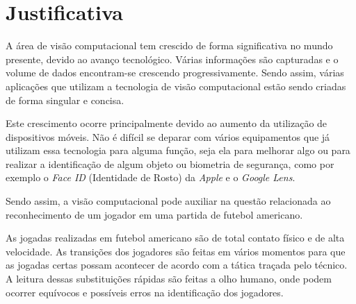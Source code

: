 \section{\textbf{Justificativa}}

A área de visão computacional tem crescido de forma significativa no mundo presente, devido ao avanço tecnológico. Várias informações são capturadas e o volume de dados encontram-se crescendo progressivamente. Sendo assim, várias aplicações que utilizam a tecnologia de visão computacional estão sendo criadas de forma singular e concisa.

Este crescimento ocorre principalmente devido ao aumento da utilização de dispositivos móveis. Não é difícil se deparar com vários equipamentos que já utilizam essa tecnologia para alguma função, seja ela para melhorar algo ou para realizar a identificação de algum objeto ou biometria de segurança, como por exemplo o \textit{Face ID} (Identidade de Rosto) da \textit{Apple} e o \textit{Google Lens}.

Sendo assim, a visão computacional pode auxiliar na questão relacionada ao reconhecimento de um jogador em uma partida de futebol americano.

As jogadas realizadas em futebol americano são de total contato físico e de alta velocidade. As transições dos jogadores são feitas em vários momentos para que as jogadas certas possam acontecer de acordo com a tática traçada pelo técnico. A leitura dessas substituições rápidas são feitas a olho humano, onde podem ocorrer equívocos e possíveis erros na identificação dos jogadores.